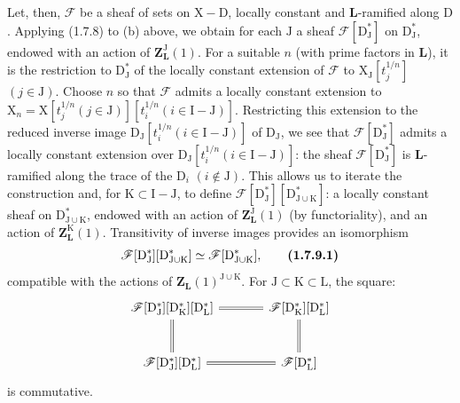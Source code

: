 \documentclass[11pt,leqno]{article}
\begin{document}
Let, then, \(\mathscr{F}\) be a sheaf of sets on \(\mathrm{X}-\mathrm{D}\), locally constant and \(\mathbf{L}\)-ramified along \(\mathrm{D}\). Applying (1.7.8) to (b) above, we obtain for each \(\mathrm{J}\) a sheaf \(\mathscr{F}[\mathrm{D}_{\mathrm{J}}^*]\) on \(\mathrm{D}_{\mathrm{J}}^*\), endowed with an action of \(\mathbf{Z}_{\mathbf{L}}^{\mathrm{J}}(1)\). For a suitable \(n\) (with prime factors in \(\mathbf{L}\)), it is the restriction to \(\mathrm{D}_{\mathrm{J}}^*\) of the locally constant extension of \(\mathscr{F}\) to \(\mathrm{X}_{\mathrm{J}}[t_j^{1/n}]\) \((j\in\mathrm{J})\). Choose \(n\) so that \(\mathscr{F}\) admits a locally constant extension to \(\mathrm{X}_n=\mathrm{X}[t_j^{1/n}(j\in\mathrm{J})][t_i^{1/n}(i\in\mathrm{I}-\mathrm{J})]\). Restricting this extension to the reduced inverse image \(\mathrm{D}_{\mathrm{J}}[t_i^{1/n}(i\in\mathrm{I}-\mathrm{J})]\) of \(\mathrm{D}_{\mathrm{J}}\), we see that \(\mathscr{F}[\mathrm{D}_{\mathrm{J}}^*]\) admits a locally constant extension over \(\mathrm{D}_{\mathrm{J}}[t_i^{1/n}(i\in\mathrm{I}-\mathrm{J})]\): the sheaf \(\mathscr{F}[\mathrm{D}_{\mathrm{J}}^*]\) is \(\mathbf{L}\)-ramified along the trace of the \(\mathrm{D}_i\) \((i\notin\mathrm{J})\). This allows us to iterate the construction and, for \(\mathrm{K}\subset\mathrm{I}-\mathrm{J}\), to define \(\mathscr{F}[\mathrm{D}_{\mathrm{J}}^*][\mathrm{D}_{\mathrm{J}\cup\mathrm{K}}^*]\): a locally constant sheaf on \(\mathrm{D}_{\mathrm{J}\cup\mathrm{K}}^*\), endowed with an action of \(\mathbf{Z}_{\mathbf{L}}^{\mathrm{J}}(1)\) (by functoriality), and an action of \(\mathbf{Z}_{\mathbf{L}}^{\mathrm{K}}(1)\). Transitivity of inverse images provides an isomorphism
\[
\mathscr{F}[\mathrm{D}_{\mathrm{J}}^*][\mathrm{D}_{\mathrm{J}\cup\mathrm{K}}^*]
\simeq
\mathscr{F}[\mathrm{D}_{\mathrm{J}\cup\mathrm{K}}^*],
\tag*{\textbf{(1.7.9.1)}}
\]
compatible with the actions of \(\mathbf{Z}_{\mathbf{L}}(1)^{\mathrm{J}\cup\mathrm{K}}\). For \(\mathrm{J}\subset\mathrm{K}\subset\mathrm{L}\), the square:
\[
\begin{tikzcd}[ampersand replacement=\&, row sep=large, column sep=large]
\mathscr{F}[\mathrm{D}_{\mathrm{J}}^*][\mathrm{D}_{\mathrm{K}}^*][\mathrm{D}_{\mathrm{L}}^*]
  \arrow[r, equal] \arrow[d, equal]
\&
\mathscr{F}[\mathrm{D}_{\mathrm{K}}^*][\mathrm{D}_{\mathrm{L}}^*]
  \arrow[d, equal]
\\
\mathscr{F}[\mathrm{D}_{\mathrm{J}}^*][\mathrm{D}_{\mathrm{L}}^*]
  \arrow[r, equal]
\&
\mathscr{F}[\mathrm{D}_{\mathrm{L}}^*]
\end{tikzcd}
\]
is commutative.
\end{document}
